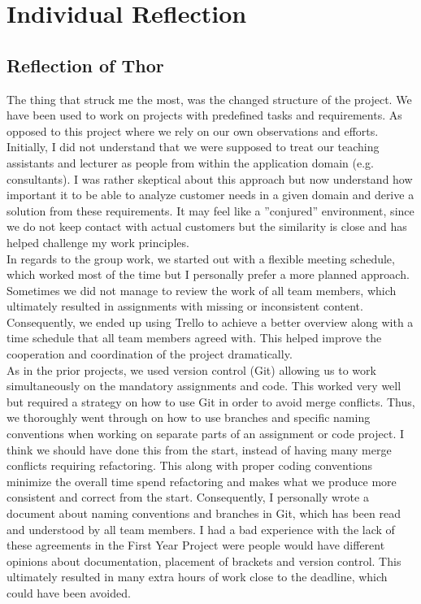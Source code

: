 \section{Individual Reflection}

\subsection{Reflection of Thor}
The thing that struck me the most, was the changed structure of the project. We have been used to work on projects with predefined tasks and requirements. As opposed to this project where we rely on our own observations and efforts. Initially, I did not understand that we were supposed to treat our teaching assistants and lecturer as people from within the application domain (e.g. consultants). I was rather skeptical about this approach but now understand how important it to be able to analyze customer needs in a given domain and derive a solution from these requirements. It may feel like a ”conjured” environment, since we do not keep contact with actual customers but the similarity is close and has helped challenge my work principles. 
\\
In regards to the group work, we started out with a flexible meeting schedule, which worked most of the time but I personally prefer a more planned approach. Sometimes we did not manage to review the work of all team members, which ultimately resulted in assignments with missing or inconsistent content. Consequently, we ended up using Trello to achieve a better overview along with a time schedule that all team members agreed with. This helped improve the cooperation and coordination of the project dramatically. 
\\
As in the prior projects, we used version control (Git) allowing us to work simultaneously on the mandatory assignments and code. This worked very well but required a strategy on how to use Git in order to avoid merge conflicts. Thus, we thoroughly went through on how to use branches and specific naming conventions when working on separate parts of an assignment or code project. I think we should have done this from the start, instead of having many merge conflicts requiring refactoring. This along with proper coding conventions minimize the overall time spend refactoring and makes what we produce more consistent and correct from the start. Consequently, I personally wrote a document about naming conventions and branches in Git, which has been read and understood by all team members. I had a bad experience with the lack of these agreements in the First Year Project were people would have different opinions about documentation, placement of brackets and version control. This ultimately resulted in many extra hours of work close to the deadline, which could have been avoided. 

